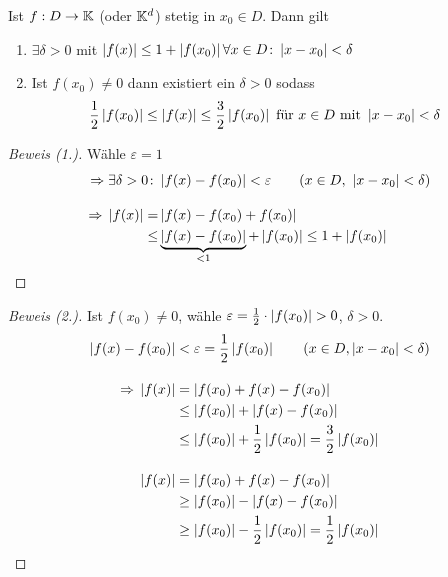 \begin{lemma} %
    \label{lemma:abschaetzung-stetigkeit}
    Ist $f:D\rightarrow{}\mathbb{K}$ (oder $\mathbb{K}^d$) stetig in $x_0\in D$. Dann gilt
    \begin{enumerate}[label=\arabic*.]
        \item $\exists \delta > 0$ mit $\left\lvert f(x)\right\rvert\leq 1+\left\lvert f(x_0)\right\rvert$\quad$\forall x\in D\colon \left\lvert x-x_0\right\rvert < \delta$
        \item Ist $f(x_0) \neq 0$ dann existiert ein $\delta>0$ sodass
        \begin{align*}
            \frac{1}{2}\left\lvert f(x_0)\right\rvert &\leq \left\lvert f(x)\right\rvert \leq \frac{3}{2} \left\lvert f(x_0)\right\rvert \text{ für } x\in D \text{ mit } \left\lvert x-x_0\right\rvert < \delta
        \end{align*}
    \end{enumerate}

    \begin{proof}[Beweis (1.)]
        Wähle $\varepsilon = 1$
        \begin{align*}
            \impl \exists\delta > 0\colon &\abs{f(x)-f(x_0)} < \varepsilon\tag{$x\in D,~\abs{x-x_0} < \delta$}\\[10pt]
            \impl \abs{f(x)} = &\abs{f(x)-f(x_0)+f(x_0)}\\
            \leq &\underbrace{\abs{f(x)-f(x_0)}}_{< 1} + \abs{f(x_0)}\leq 1 + \abs{f(x_0)}\qedhere
        \end{align*}
    \end{proof}
    \begin{proof}[Beweis (2.)]
        Ist $f(x_0) \neq 0$, wähle $\varepsilon = \frac{1}{2}\cdot\left\lvert f(x_0)\right\rvert > 0$, $\delta > 0$.
        \begin{align*}
            \abs{f(x)-f(x_0)} &< \varepsilon = \frac{1}{2} \abs{f(x_0)} \tag{$x\in D, \abs{x-x_0} < \delta$}\\[10pt]
            \impl \abs{f(x)} &= \abs{f(x_0)+f(x)-f(x_0)}\\
            &\leq \abs{f(x_0)} + \abs{f(x) - f(x_0)}\\
            &\leq \abs{f(x_0)}+\frac{1}{2}\abs{f(x_0)} = \frac{3}{2}\abs{f(x_0)}\\[10pt]
            \abs{f(x)} &= \abs{f(x_0)+f(x)-f(x_0)}\\
            &\geq \abs{f(x_0)} - \abs{f(x)-f(x_0)}\\
            &\geq \abs{f(x_0)} - \frac{1}{2} \abs{f(x_0)} = \frac{1}{2}\abs{f(x_0)}\qedhere
        \end{align*}
    \end{proof}
\end{lemma}

